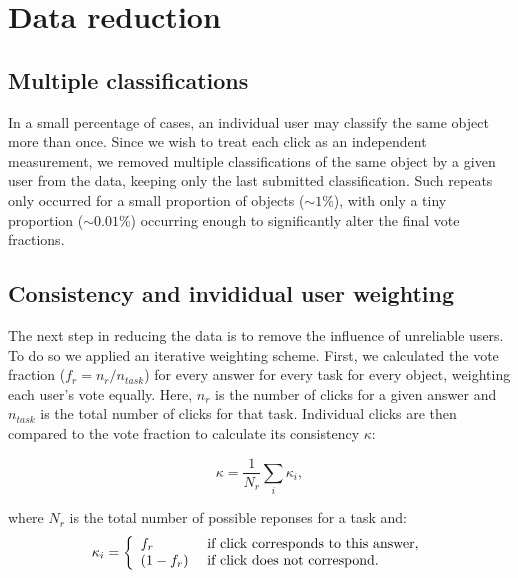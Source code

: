 \documentclass[useAMS,usenatbib]{mn2e}
\begin{document}

\section{Data reduction} \label{sec-datareduction}

\subsection{Multiple classifications}
In a small percentage of cases, an individual user may classify the same object more than once. Since we wish to treat each click as an independent measurement, we removed multiple classifications of the same object by a given user from the data, keeping only the last submitted classification. Such repeats only occurred for a small proportion of objects ($\sim1\%$), with only a tiny proportion ($\sim0.01\%$) occurring enough to significantly alter the final vote fractions. 

\subsection{Consistency and invididual user weighting}\label{ssec-consistency}

The next step in reducing the data is to remove the influence of unreliable users. To do so we applied an iterative weighting scheme. First, we calculated the vote fraction ($f_r = n_{r}/n_{task}$) for every answer for every task for every object, weighting each user's vote equally. Here, $n_r$ is the number of clicks for a given answer and $n_{task}$ is the total number of clicks for that task. Individual clicks are then compared to the vote fraction to calculate its consistency $\kappa$:

\begin{equation}
\kappa = \frac{1}{N_r}\sum_i{\kappa_i},
\label{eqn-consistency}
\end{equation}

where $N_r$ is the total number of possible reponses for a task and: 
\begin{equation}
    \kappa_i = \left\{
    \begin{array}{l l}
      f_r       & \text{ if click corresponds to this answer,} \\
      (1 - f_r) & \text{ if click does not correspond.}\\
    \end{array} \right.
    \label{eqn-consistency2}
 \end{equation}
\end{document}

